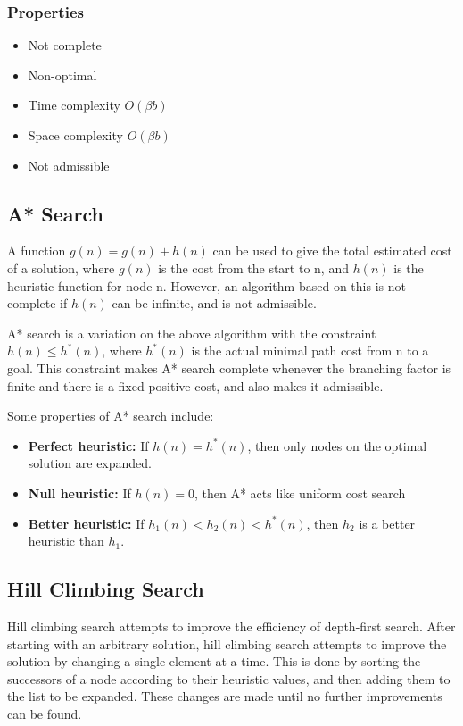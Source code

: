 \documentclass[12pt,titlepage]{article}
\begin{document}
      \subsubsection{Properties}
        \begin{itemize}
          \item Not complete
          \item Non-optimal
          \item Time complexity $O(\beta b)$
          \item Space complexity $O(\beta b)$
          \item Not admissible
        \end{itemize}

    \subsection{A* Search}
      A function $g(n) = g(n) + h(n)$ can be used to give the total estimated cost of a solution, where $g(n)$ is the cost from the start to n,
      and $h(n)$ is the heuristic function for node n. However, an algorithm based on this is not complete if $h(n)$ can be infinite, and is
      not admissible.

      A* search is a variation on the above algorithm with the constraint $h(n) \leq h^*(n)$, where $h^*(n)$ is the actual minimal path cost from
      n to a goal. This constraint makes A* search complete whenever the branching factor is finite and there is a fixed positive cost, and also
      makes it admissible.

      Some properties of A* search include:
      \begin{itemize}
        \item \textbf{Perfect heuristic:} If $h(n) = h^*(n)$, then only nodes on the optimal solution are expanded.
        \item \textbf{Null heuristic:} If $h(n) = 0$, then A* acts like uniform cost search
        \item \textbf{Better heuristic:} If $h_1(n) < h_2(n) < h^*(n)$, then $h_2$ is a better heuristic than $h_1$.
      \end{itemize}

    \subsection{Hill Climbing Search}
      Hill climbing search attempts to improve the efficiency of depth-first search. After starting with an arbitrary solution, hill climbing
      search attempts to improve the solution by changing a single element at a time. This is done by sorting the successors of a node according
      to their heuristic values, and then adding them to the list to be expanded. These changes are made until no further improvements can be found.
\end{document}
